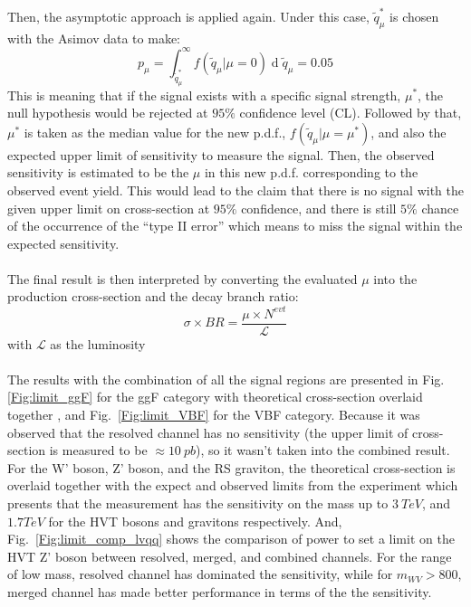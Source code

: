 \\
\\Then, the asymptotic approach is applied again. Under this case, $\tilde{q}_{\mu}^{*}$ is chosen with the Asimov data to make:
\begin{equation}
p_{\mu}=\int_{\tilde{q}_{\mu}^{*}}^{\infty}f(\tilde{q}_{\mu}|\mu=0)\operatorname{d}\tilde{q}_{\mu}=0.05
\end{equation}
\noindent
This is meaning that if the signal exists with a specific signal strength, $\mu^*$, the null hypothesis would be rejected at $95\%$ confidence level (CL). Followed by that, $\mu^*$ is taken as the median value for the new p.d.f., $f(\tilde{q}_{\mu}|\mu=\mu^*)$, and also the expected upper limit of sensitivity to measure the signal. Then, the observed sensitivity is estimated to be the $\mu$ in this new p.d.f. corresponding to the observed event yield. This would lead to the claim that there is no signal with the given upper limit on cross-section at $95\%$ confidence, and there is still $5\%$ chance of the occurrence of the ``type II error'' which means to miss the signal within the expected sensitivity. 
\\
\\The final result is then interpreted by converting the evaluated $\mu$ into the production cross-section and the decay branch ratio:
\begin{equation}
\sigma\times BR=\frac{\mu\times N^{evt}}{\mathcal{L}}
\end{equation}  
with $\mathcal{L}$ as the luminosity
\\
\\The results with the combination of all the signal regions are presented in Fig.~ \ref{Fig:limit_ggF} for the ggF category with theoretical cross-section overlaid together , and Fig.~\ref{Fig:limit_VBF} for the VBF category. Because it was observed that the resolved channel has no sensitivity (the upper limit of cross-section is measured to be $\approx10~pb$), so it wasn't taken into the combined result. For the W' boson, Z' boson, and the RS graviton, the theoretical cross-section is overlaid together with the expect and observed limits from the experiment which presents that the measurement has the sensitivity on the mass up to $3~TeV$, and $1.7TeV$ for the HVT bosons and gravitons respectively. And, Fig.~\ref{Fig:limit_comp_lvqq} shows the comparison of power to set a limit on the HVT Z' boson between resolved, merged, and combined channels. For the range of low mass, resolved channel has dominated the sensitivity, while for $m_{WV}>800$, merged channel has made better performance in terms of the the sensitivity.

